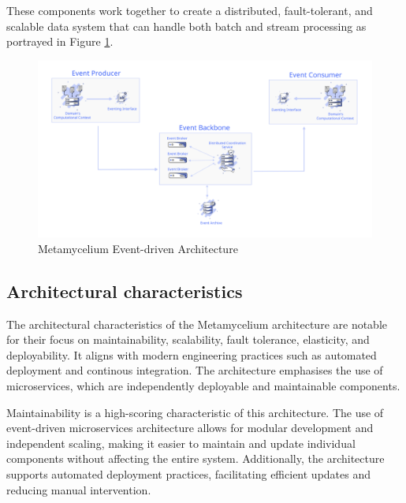 \documentclass[preprint,12pt]{elsarticle}
\begin{document}

These components work together to create a distributed, fault-tolerant, and scalable data system that can handle both batch and stream processing as portrayed in Figure \ref{fig:eventDrivenArchitecture}. 

\begin{figure}[h]
  \centering
  \includegraphics[width=\textwidth]{images/Event-architecture.png}
  \caption{Metamycelium Event-driven Architecture}
  \label{fig:eventDrivenArchitecture}
\end{figure}


\subsection{Architectural characteristics}

The architectural characteristics of the Metamycelium architecture are notable for their focus on maintainability, scalability, fault tolerance, elasticity, and deployability. It aligns with modern engineering practices such as automated deployment and continous integration. The architecture emphasises the use of microservices, which are independently deployable and maintainable components.

Maintainability is a high-scoring characteristic of this architecture. The use of event-driven microservices architecture allows for modular development and independent scaling, making it easier to maintain and update individual components without affecting the entire system. Additionally, the architecture supports automated deployment practices, facilitating efficient updates and reducing manual intervention.
\end{document}
